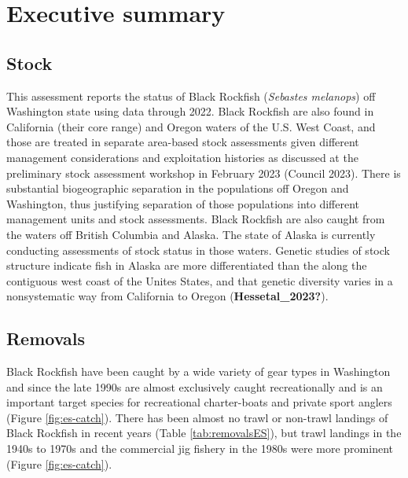 \documentclass[11pt,
  english,
  letterpaper,
]{article}
\begin{document}
\newcommand{\lt}{\ensuremath <}
\newcommand{\gt}{\ensuremath >}

\vspace{500cm}

\pagebreak
{}
\setcounter{page}{1}

\renewcommand{\thetable}{\roman{table}}
\renewcommand{\thefigure}{\roman{figure}}

\setlength\parskip{0.5em plus 0.1em minus 0.2em}

\hypertarget{executive-summary}{%
\section*{Executive summary}\label{executive-summary}}

\hypertarget{stock}{%
\subsection*{Stock}\label{stock}}

This assessment reports the status of Black Rockfish (\emph{Sebastes melanops}) off Washington state using data through 2022. Black Rockfish are also found in California (their core range) and Oregon waters of the U.S. West Coast, and those are treated in separate area-based stock assessments given different management considerations and exploitation histories as discussed at the preliminary stock assessment workshop in February 2023 (Council 2023). There is substantial biogeographic separation in the populations off Oregon and Washington, thus justifying separation of those populations into different management units and stock assessments. Black Rockfish are also caught from the waters off British Columbia and Alaska. The state of Alaska is currently conducting assessments of stock status in those waters. Genetic studies of stock structure indicate fish in Alaska are more differentiated than the along the contiguous west coast of the Unites States, and that genetic diversity varies in a nonsystematic way from California to Oregon (\textbf{Hessetal\_2023?}).

\hypertarget{removals}{%
\subsection*{Removals}\label{removals}}

Black Rockfish have been caught by a wide variety of gear types in Washington and since the late 1990s are almost exclusively caught recreationally and is an important target species for recreational charter-boats and private sport anglers (Figure \ref{fig:es-catch}). There has been almost no trawl or non-trawl landings of Black Rockfish in recent years (Table \ref{tab:removalsES}), but trawl landings in the 1940s to 1970s and the commercial jig fishery in the 1980s were more prominent (Figure \ref{fig:es-catch}).
\end{document}
